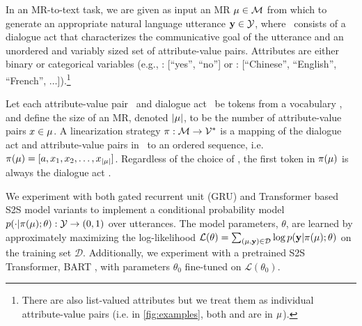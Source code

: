 In an MR-to-text task, we are given as input an MR $\mu \in \mathcal{M}$ from which
to generate an appropriate natural language utterance $\mathbf{y}  \in \mathcal{Y}$, where
\mr~consists of a dialogue act that characterizes the communicative goal of the
utterance and an unordered and variably sized set of attribute-value pairs.
Attributes are either binary or categorical variables (e.g.,
: [``yes'', ``no''] or : [``Chinese'',
``English'', ``French'', $\ldots$]).\footnote{There are also list-valued
attributes but we treat them as individual attribute-value pairs (i.e. in
\autoref{fig:examples}, both  and
 are in $\mu$).}

Let each attribute-value pair \attr~and dialogue act \da~be tokens from a
vocabulary \Attrs, and define the size of an MR, denoted  ${\lvert \mu \rvert}$,  to be
the number of attribute-value pairs $x \in \mu$.  A linearization
strategy $\pi : \mathcal{M} \rightarrow \mathcal{V}^*$ is a mapping of the dialogue act
and attribute-value pairs in \mr~to an ordered sequence, i.e.  $\pi(\mu) = [a,
x_1, x_2, \ldots, x_{{\lvert \mu \rvert}}]$.  Regardless of the choice of
\lin, the first token in $\pi(\mu)$ is always the dialogue act \da.

We experiment with both gated recurrent unit (GRU) \cite{cho2014} and
Transformer \cite{vaswani2017} based S2S model variants to implement a
conditional probability model $p(\cdot| \pi(\mu); \theta) : \mathcal{Y}
\rightarrow (0, 1)$ over utterances. The model parameters,
$\theta$, are learned by approximately maximizing the log-likelihood
$\mathcal{L}(\theta)= \sum_{(\mu,\mathbf{y})\in \mathcal{D}}  \log
p(\mathbf{y}|\pi(\mu); \theta)$ on the training set $\mathcal{D}$.
Additionally, we experiment with a pretrained S2S Transformer, BART
\cite{lewis2020}, with parameters $\theta_0$ fine-tuned on
$\mathcal{L}(\theta_0)$.
